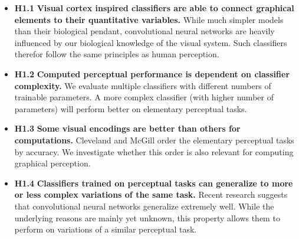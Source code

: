 \begin{itemize}
	\item \textbf{H1.1} \textbf{Visual cortex inspired classifiers are able to connect graphical elements to their quantitative variables.} While much simpler models than their biological pendant, convolutional neural networks are heavily influenced by our biological knowledge of the visual system. Such classifiers therefor follow the same principles as human perception.
	\item \textbf{H1.2} \textbf{Computed perceptual performance is dependent on classifier complexity.} We evaluate multiple classifiers with different numbers of trainable parameters. A more complex classifier (with higher number of parameters) will perform better on elementary perceptual tasks.
	\item \textbf{H1.3} \textbf{Some visual encodings are better than others for computations.} Cleveland and McGill order the elementary perceptual tasks by accuracy. We investigate whether this order is also relevant for computing graphical perception.
	\item \textbf{H1.4} \textbf{Classifiers trained on perceptual tasks can generalize to more or less complex variations of the same task.} Recent research suggests that convolutional neural networks generalize extremely well. While the underlying reasons are mainly yet unknown, this property allows them to perform on variations of a similar perceptual task.
\end{itemize}
